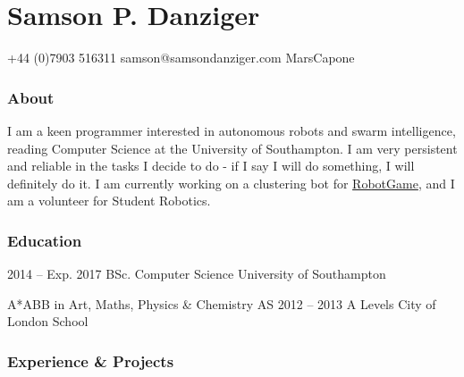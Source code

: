 \documentclass{tccv}
\begin{document}
\part{Samson P. Danziger}

    {+44 (0)7903 516311}
    {samson@samsondanziger.com}
    {MarsCapone}
    
\section{About}
I am a keen programmer interested in autonomous robots and swarm intelligence, reading Computer Science at the University of Southampton. I am very persistent and reliable in the tasks I decide to do - if I say I will do something, I will definitely do it. I am currently working on a clustering bot for \href{https://robotgame.net}{RobotGame}, and I am a volunteer for Student Robotics.
\section{Education} \begin{yearlist} \item{2014 -- Exp. 2017} {BSc. Computer Science} {University of Southampton} \item[A*ABB in Art, Maths, Physics \& Chemistry AS]{2012 -- 2013}
     {A Levels}
     {City of London School}


\end{yearlist}

\section{Experience \& Projects}
\end{document}
